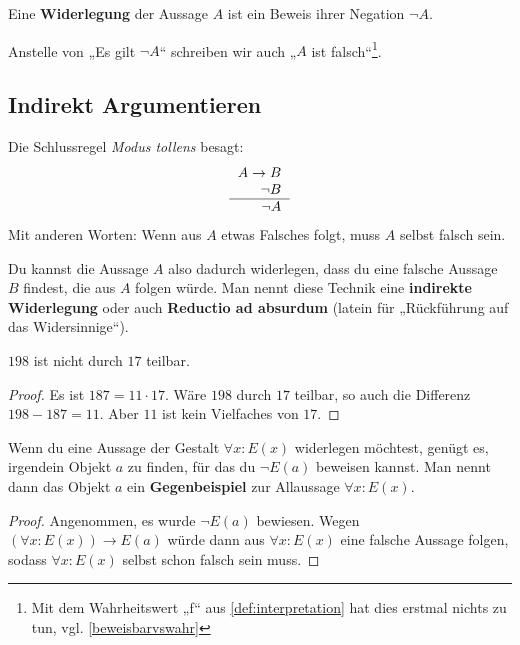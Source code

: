 \begin{defin}[Widerlegung] 
    Eine \textbf{Widerlegung} der Aussage $A$ ist ein Beweis ihrer Negation $\neg A$.
    
    Anstelle von „Es gilt $\neg A$“ schreiben wir auch „$A$ ist falsch“\footnote{Mit dem Wahrheitswert „f“ aus \cref{def:interpretation} hat dies erstmal nichts zu tun, vgl. \cref{beweisbarvswahr}}.
\end{defin}


\subsection*{Indirekt Argumentieren}


\begin{axiom} \label{reductio}
    Die Schlussregel \emph{Modus tollens} besagt:
    \[\begin{tabular}{r}
        $A\to B$ \\
        $\neg B$ \\ \hline
        $\neg A$
    \end{tabular} \]
    Mit anderen Worten: Wenn aus $A$ etwas Falsches folgt, muss $A$ selbst falsch sein.
    
    Du kannst die Aussage $A$ also dadurch widerlegen, dass du eine falsche Aussage $B$ findest, die aus $A$ folgen würde. Man nennt diese Technik eine \textbf{indirekte Widerlegung} oder auch \textbf{Reductio ad absurdum} (latein für „Rückführung auf das Widersinnige“).
\end{axiom}


\begin{bsp} \label{bsp:reductio}
    $198$ ist nicht durch $17$ teilbar.
\end{bsp}
\begin{proof}
    Es ist $187=11\cdot 17$. Wäre $198$ durch $17$ teilbar, so auch die Differenz $198-187 = 11$. Aber $11$ ist kein Vielfaches von $17$.
\end{proof}


\begin{satz} \label{gegenbeispiel} 
    Wenn du eine Aussage der Gestalt $\forall x: E(x)$ widerlegen möchtest, genügt es, irgendein Objekt $a$ zu finden, für das du $\neg E(a)$ beweisen kannst. Man nennt dann das Objekt $a$ ein \textbf{Gegenbeispiel} zur Allaussage $\forall x: E(x)$.
\end{satz}
\begin{proof}
    Angenommen, es wurde $\neg E(a)$ bewiesen. Wegen $(\forall x: E(x)) \to E(a)$ würde dann aus $\forall x:E(x)$ eine falsche Aussage folgen, sodass $\forall x:E(x)$ selbst schon falsch sein muss.
\end{proof}

